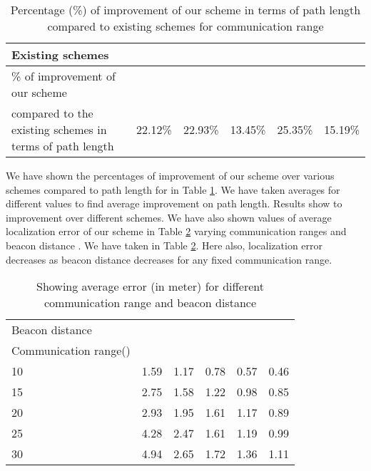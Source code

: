 \documentclass[preprint,11pt]{elsarticle}
\begin{document}
\begin{table}[h]
\center
\caption{Percentage (\%) of improvement of our scheme in terms of path length compared to existing schemes for communication range }
\label{table:6}
\begin{tabular}{p{5.4cm}|p{2.2cm}|p{1.7cm}|p{1.2cm}|p{1.2cm}|p{1.2cm}}
\hline
\hline
Existing schemes &   &   &   &  &  \\
\hline
\% of improvement of our scheme &      &     &  & &      \\
compared to the existing schemes in terms of path length & 22.12\% & 22.93\% & 13.45\% & 25.35\% & 15.19\% \\
\hline
\hline
\end{tabular}
\end{table}
We have shown the percentages of improvement of our scheme over various schemes compared to path length for  in Table \ref{table:6}. We have taken averages for different  values to find average improvement on path length. Results show  to  improvement over different schemes. We have also shown values of average localization error of our scheme in Table \ref{table:4} varying communication ranges  and beacon distance . We have taken  in Table \ref{table:4}. Here also, localization error decreases as beacon distance decreases for any fixed communication range.

\begin{table}[]
\centering
\caption{Showing average error (in meter) for different communication range and beacon distance \label{table:4}}
\begin{tabular}
{p{4.5cm}|p{1.2cm}|p{1.2cm}|p{1.2cm}|p{1.2cm}|p{1.2cm} }
\hline
\hline
Beacon distance   &  &  &  &  &  \\
Communication range()  &&&&&\\
\hline
10 &1.59  &1.17  &0.78  &0.57  &0.46  \\
15 &2.75  &1.58  &1.22  &0.98  &0.85  \\
20 &2.93  &1.95  &1.61  &1.17  &0.89  \\
25 &4.28  &2.47  &1.61  &1.19  &0.99  \\
30 &4.94  &2.65  &1.72  &1.36  &1.11  \\
\hline
\hline
\end{tabular}
\end{table}
\end{document}
